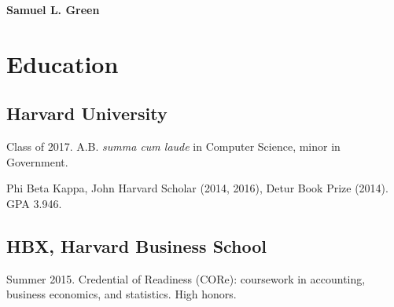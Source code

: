 \documentclass[letterpaper]{amsart}
\def\name{Samuel L. Green}
\renewenvironment{itemize}{
  \begin{list}{}{
    \setlength{\leftmargin}{1.5em}
  }
}{
  \end{list}
}
\begin{document}

\centerline{\huge \bf \name}

\vspace{0.1in}


\section*{Education}

\subsection*{Harvard University} 
\begin{itemize}
\item Class of 2017. A.B. \textit{summa cum laude} in Computer Science, minor in Government.
\item Phi Beta Kappa, John Harvard Scholar (2014, 2016), Detur Book Prize (2014).  GPA 3.946. 
\end{itemize}

\subsection*{HBX, Harvard Business School}
\begin{itemize}
\item{Summer 2015. Credential of Readiness (CORe): coursework in accounting, business economics, and statistics. High honors.}
\end{itemize}
\end{document}
